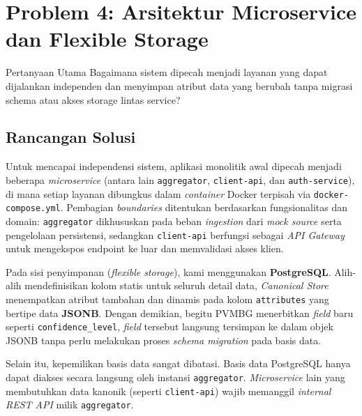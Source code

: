 \section{Problem 4: Arsitektur Microservice dan Flexible Storage}
\begin{infobox}{Pertanyaan Utama}
Bagaimana sistem dipecah menjadi layanan yang dapat dijalankan independen dan
menyimpan atribut data yang berubah tanpa migrasi schema atau akses storage
lintas service?
\end{infobox}

\subsection{Rancangan Solusi}
Untuk mencapai independensi sistem, aplikasi monolitik awal dipecah menjadi beberapa \textit{microservice} (antara lain \texttt{aggregator}, \texttt{client-api}, dan \texttt{auth-service}), di mana setiap layanan dibungkus dalam \textit{container} Docker terpisah via \texttt{docker-compose.yml}. Pembagian \textit{boundaries} ditentukan berdasarkan fungsionalitas dan domain: \texttt{aggregator} dikhususkan pada beban \textit{ingestion} dari \textit{mock source} serta pengelolaan persistensi, sedangkan \texttt{client-api} berfungsi sebagai \textit{API Gateway} untuk mengekspos endpoint ke luar dan memvalidasi akses klien.

Pada sisi penyimpanan (\textit{flexible storage}), kami menggunakan \textbf{PostgreSQL}. Alih-alih mendefinisikan kolom statis untuk seluruh detail data, \textit{Canonical Store} menempatkan atribut tambahan dan dinamis pada kolom \texttt{attributes} yang bertipe data \textbf{JSONB}. Dengan demikian, begitu PVMBG menerbitkan \textit{field} baru seperti \texttt{confidence\_level}, \textit{field} tersebut langsung tersimpan ke dalam objek JSONB tanpa perlu melakukan proses \textit{schema migration} pada basis data.

Selain itu, kepemilikan basis data sangat dibatasi. Basis data PostgreSQL hanya dapat diakses secara langsung oleh instansi \texttt{aggregator}. \textit{Microservice} lain yang membutuhkan data kanonik (seperti \texttt{client-api}) wajib memanggil \textit{internal REST API} milik \texttt{aggregator}.

